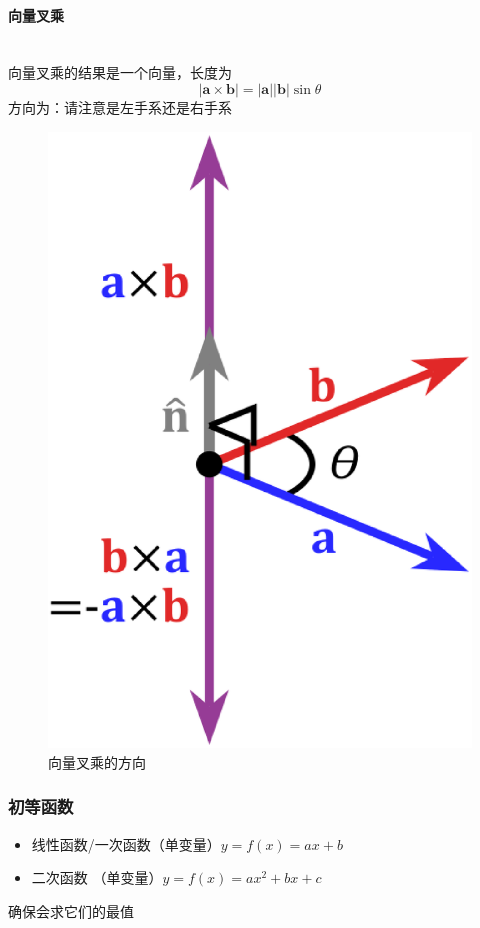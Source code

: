 \documentclass[a4paper, 11pt, oneside]{article}
\newcommand{\bol}[1]{\textbf{#1}}
\begin{document}
\paragraph{向量叉乘}\quad\\
\indent 向量叉乘的结果是一个向量，长度为
\begin{displaymath}
	\vert \bol{a} \times \bol{b} \vert = \vert\bol{a}\vert \vert\bol{b}\vert \sin{\theta}
\end{displaymath}
方向为：请注意是左手系还是右手系
\begin{figure}[!h]
\center
\includegraphics[scale=0.3]{./asset/vector_times.eps}
\caption{向量叉乘的方向}
\end{figure}
\subsubsection{初等函数}
\begin{itemize}
	\item 线性函数/一次函数（单变量）$y = f(x) = ax+b$
	\item 二次函数 （单变量）$y = f(x) = ax^2 + bx + c$
\end{itemize}
确保会求它们的最值
\newpage
\end{document}
